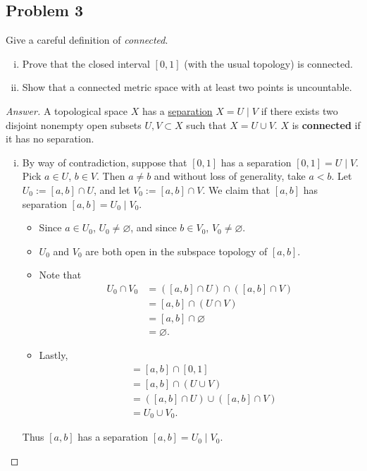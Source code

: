 \documentclass[12pt]{article}
\newcommand{\ita}[1]{\textit{#1}}
\newcommand\paren[1]{\left( #1 \right)}
\theoremstyle{definition}
\begin{document}
\subsection{Problem 3 \texorpdfstring{\cite{Munkres,Blair}}{}}
Give a careful definition of \ita{connected}.
\begin{enumerate}[(i)]
    \item Prove that the closed interval $[0,1]$ (with the usual topology) is connected.
    \item Show that a connected metric space with at least two points is uncountable.
\end{enumerate}
\begin{proof}[Answer]
    A topological space $X$ has a \underline{separation} $X = U \mid V$ if there exists two disjoint nonempty open subsets $U , V \subset X$ such that $X = U \cup V$. $X$ is \textbf{connected} if it has no separation.
    \begin{enumerate}[(i)]
        \item By way of contradiction, suppose that $[0,1]$ has a separation $[0,1] = U \mid V$. Pick $a \in U$, $b \in V$. Then $a \neq b$ and without loss of generality, take $a < b$. Let $U_0 := [a,b] \cap U$, and let $V_0 := [a,b] \cap V$. We claim that $[a,b]$ has separation $[a,b] = U_0 \mid V_0$. 
        \begin{itemize}
            \item Since $a \in U_0$, $U_0 \neq \varnothing$, and since $b \in V_0$, $V_0 \neq \varnothing$.
            \item $U_0$ and $V_0$ are both open in the subspace topology of $[a,b]$.
            \item Note that 
            \begin{align*}
                U_0 \cap V_0 & = \paren{ [a,b] \cap U } \cap \paren{ [a,b] \cap V } \\
                & = [a,b] \cap \paren{ U \cap V } \\
                & = [a,b] \cap \varnothing \\
                & = \varnothing.
            \end{align*}
            \item Lastly,
            \begin{align*}
                [a,b] & = [a,b] \cap [0,1] \\
                & = [a,b] \cap \paren{ U \cup V } \\
                & = \paren{ [a,b] \cap U } \cup \paren{ [a,b] \cap V } \\
                & = U_0 \cup V_0.
            \end{align*}
        \end{itemize}
        Thus $[a,b]$ has a separation $[a,b] = U_0 \mid V_0$.
        

\end{enumerate}
\end{proof}
\end{document}
